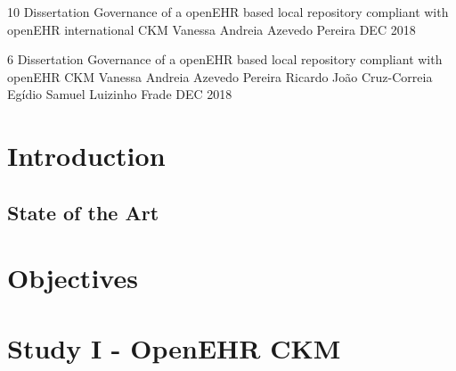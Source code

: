 \documentclass[a4paper, twoside, openright]{report}
\begin{document}
\setcounter{page}{1}

\frontCover
{10}
{Dissertation}
{Governance of a openEHR based local repository compliant with openEHR international CKM}
{Vanessa Andreia Azevedo Pereira}
{DEC}
{2018}

\innerCover
{6}
{Dissertation}
{Governance of a openEHR based local repository 
compliant with openEHR CKM}
{Vanessa Andreia Azevedo Pereira}
{Ricardo João Cruz-Correia}
{Egídio Samuel Luizinho Frade}
{DEC}
{2018}











\tableofcontents

\listoffigures

\listoftables



\chapter{Introduction}

\section{State of the Art}





\chapter{Objectives}


\chapter{Study I - OpenEHR CKM}

\end{document}
